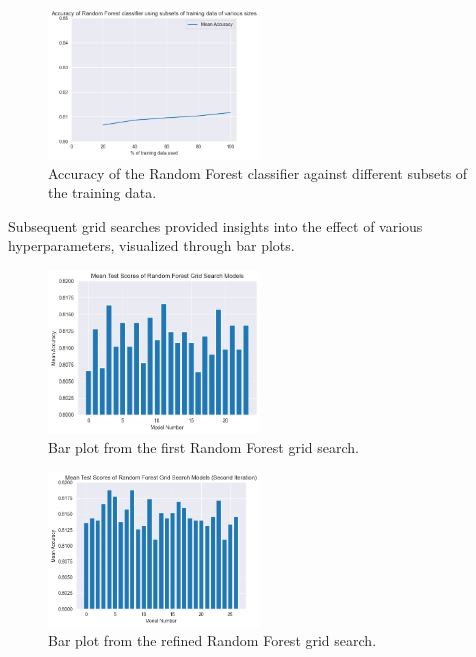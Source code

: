 \documentclass[conference]{IEEEtran}
\begin{document}
	\begin{figure}[htbp]
		\centering
		\includegraphics[width=0.5\textwidth]{rf_accuracy_plot.png}
		\caption{Accuracy of the Random Forest classifier against different subsets of the training data.}
		\label{fig:rf_accuracy_plot}
	\end{figure}
	
	Subsequent grid searches provided insights into the effect of various hyperparameters, visualized through bar plots.
	
	\begin{figure}[htbp]
		\centering
		\includegraphics[width=0.5\textwidth]{rf_barplot1.png}
		\caption{Bar plot from the first Random Forest grid search.}
		\label{fig:rf_barplot1}
	\end{figure}
	
	\begin{figure}[htbp]
		\centering
		\includegraphics[width=0.5\textwidth]{rf_barplot2.png}
		\caption{Bar plot from the refined Random Forest grid search.}
		\label{fig:rf_barplot2}
	\end{figure}
	
\end{document}
